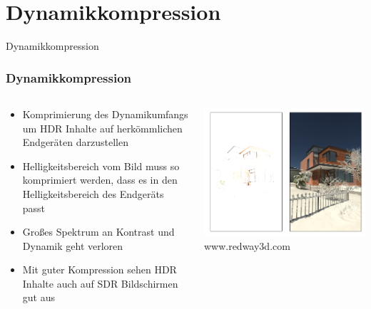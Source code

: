 \documentclass{beamer}
\begin{document}
	\section{Dynamikkompression}
	\begin{frame}
		\begin{center}
			\Huge Dynamikkompression
		\end{center}
	\end{frame}

	\begin{frame}
	\frametitle{Dynamikkompression}
	\begin{columns}
		\begin{column}{0.5\textwidth}
			\begin{itemize}[label=\textcolor{red!65!black}{\textbullet}]
				\item Komprimierung des Dynamikumfangs um HDR Inhalte auf herkömmlichen Endgeräten darzustellen
				\item Helligkeitsbereich vom Bild muss so komprimiert werden, dass es in den Helligkeitsbereich des Endgeräts passt
				\item Großes Spektrum an Kontrast und Dynamik geht verloren
				\item Mit guter Kompression sehen HDR Inhalte auch auf SDR Bildschirmen gut aus
			\end{itemize}
		\end{column}
		\begin{column}{0.5\textwidth}
			\includegraphics[scale=0.43]{img/bild6.png}
			\tiny www.redway3d.com
		\end{column}
	\end{columns}
	\end{frame}
\end{document}
